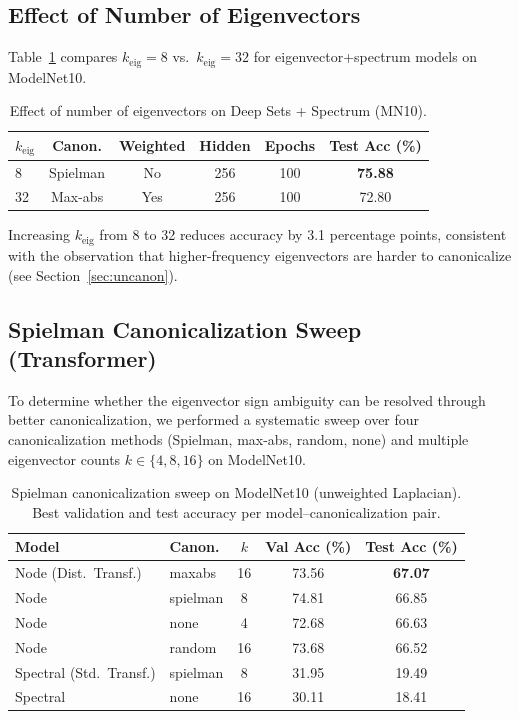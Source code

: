 \documentclass[11pt]{article}
\begin{document}
\subsection{Effect of Number of Eigenvectors}

Table~\ref{tab:neigs} compares $k_{\text{eig}} = 8$ vs.\ $k_{\text{eig}} = 32$ for
eigenvector+spectrum models on ModelNet10.

\begin{table}[ht]
\centering
\caption{Effect of number of eigenvectors on Deep Sets + Spectrum (MN10).}
\label{tab:neigs}
\begin{tabular}{lccccc}
\toprule
$k_{\text{eig}}$ & \textbf{Canon.} & \textbf{Weighted} & \textbf{Hidden} & \textbf{Epochs} & \textbf{Test Acc (\%)} \\
\midrule
8 & Spielman & No & 256 & 100 & \textbf{75.88} \\
32 & Max-abs & Yes & 256 & 100 & 72.80 \\
\bottomrule
\end{tabular}
\end{table}

Increasing $k_{\text{eig}}$ from 8 to 32 reduces accuracy by 3.1 percentage points,
consistent with the observation that higher-frequency eigenvectors are harder to
canonicalize (see Section~\ref{sec:uncanon}).

\subsection{Spielman Canonicalization Sweep (Transformer)}

To determine whether the eigenvector sign ambiguity can be resolved through better
canonicalization, we performed a systematic sweep over four canonicalization methods
(Spielman, max-abs, random, none) and multiple eigenvector counts $k \in \{4, 8, 16\}$ on
ModelNet10.

\begin{table}[ht]
\centering
\caption{Spielman canonicalization sweep on ModelNet10 (unweighted Laplacian). Best
validation and test accuracy per model--canonicalization pair.}
\label{tab:sweep_unweighted}
\footnotesize
\begin{tabular}{llccc}
\toprule
\textbf{Model} & \textbf{Canon.} & \textbf{$k$} & \textbf{Val Acc (\%)} & \textbf{Test Acc (\%)} \\
\midrule
Node (Dist.\ Transf.) & maxabs & 16 & 73.56 & \textbf{67.07} \\
Node & spielman & 8 & 74.81 & 66.85 \\
Node & none & 4 & 72.68 & 66.63 \\
Node & random & 16 & 73.68 & 66.52 \\
\midrule
Spectral (Std.\ Transf.) & spielman & 8 & 31.95 & 19.49 \\
Spectral & none & 16 & 30.11 & 18.41 \\
\bottomrule
\end{tabular}
\end{table}
\end{document}
